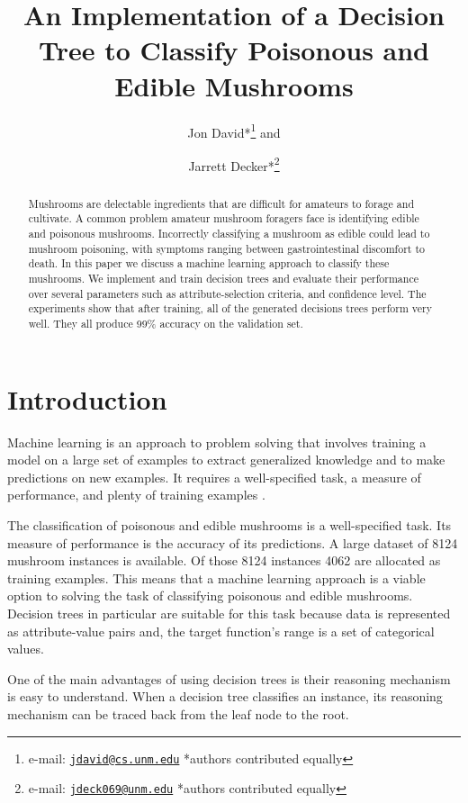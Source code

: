 \documentclass{IEEEtran}
\author{Jon David*\thanks{e-mail:
    \href{mailto:jdavid@cs.unm.edu}
         {\texttt{jdavid@cs.unm.edu}}
         {*authors contributed equally}} and
\and
       Jarrett Decker*\thanks{e-mail:
    \href{mailto:p.s.ortegel@gmail.com}
         {\texttt{jdeck069@unm.edu}}
         {*authors contributed equally}}}
\title{An Implementation of a Decision Tree to Classify Poisonous and
  Edible Mushrooms}
\begin{document}
\maketitle

\begin{abstract}

Mushrooms are delectable ingredients that are difficult for amateurs
to forage and cultivate. A common problem amateur mushroom foragers
face is identifying edible and poisonous mushrooms. Incorrectly
classifying a mushroom as edible could lead to mushroom poisoning,
with symptoms ranging between gastrointestinal discomfort to death. In
this paper we discuss a machine learning approach to classify these
mushrooms. We implement and train decision trees and evaluate their
performance over several parameters such as attribute-selection
criteria, and confidence level. The experiments show that after
training, all of the generated decisions trees perform very well. They
all produce 99\% accuracy on the validation set.

\end{abstract}

\section{Introduction}
Machine learning is an approach to problem solving that involves
training a model on a large set of examples to extract generalized
knowledge and to make predictions on new examples. It requires a
well-specified task, a measure of performance, and plenty of training
examples \parencite{mitchell1997machine}.

The classification of poisonous and edible mushrooms is a
well-specified task. Its measure of performance is the accuracy of
its predictions. A large dataset of 8124 mushroom instances is
available. Of those 8124 instances 4062 are allocated as training
examples. This means that a machine learning approach is a viable
option to solving the task of classifying poisonous and edible
mushrooms. Decision trees in particular are suitable for this
task \parencite{mitchell1997machine} because  data is represented as
attribute-value pairs and, the target function's range is a set of
categorical values. 

One of the main advantages of using decision trees is their reasoning
mechanism is easy to understand. When a decision tree classifies an
instance, its reasoning mechanism can be traced back from the leaf node
to the root.
\end{document}
